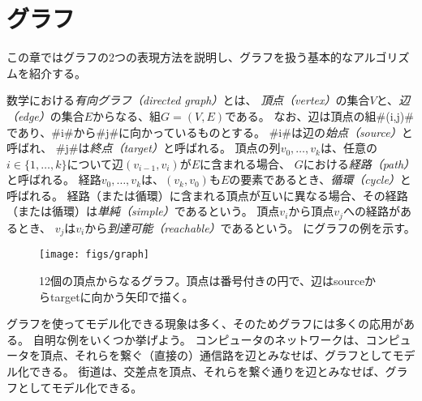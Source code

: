 \chapter{グラフ}


この章ではグラフの2つの表現方法を説明し、グラフを扱う基本的なアルゴリズムを紹介する。

数学における\emph{有向グラフ（directed graph）}とは、
%
%
\emph{頂点（vertex）}の集合$V$と、\emph{辺（edge）}の集合$E$からなる、組$G=(V,E)$である。
%
%
なお、辺は頂点の組#(i,j)#であり、#i#から#j#に向かっているものとする。
%
#i#は辺の\emph{始点（source）}と呼ばれ、
#j#は\emph{終点（target）}と呼ばれる。
頂点の列$v_0,\ldots,v_k$は、任意の$i\in\{1,\ldots,k\}$について辺$(v_{i-1},v_{i})$が$E$に含まれる場合、
$G$における\emph{経路（path）}と呼ばれる。
%
経路$v_0,\ldots,v_k$は、$(v_k,v_0)$も$E$の要素であるとき、\emph{循環（cycle）}と呼ばれる。
%
経路（または循環）に含まれる頂点が互いに異なる場合、その経路（または循環）は\emph{単純（simple）}であるという。
%
頂点$v_i$から頂点$v_j$への経路があるとき、
$v_j$は$v_i$から\emph{到達可能（reachable）}であるという。
にグラフの例を示す。

\begin{figure}
  \begin{center}
    \texttt{[image: figs/graph]}
  \end{center}
  \caption{12個の頂点からなるグラフ。頂点は番号付きの円で、辺はsourceからtargetに向かう矢印で描く。}
\end{figure}

グラフを使ってモデル化できる現象は多く、そのためグラフには多くの応用がある。
自明な例をいくつか挙げよう。
コンピュータのネットワークは、コンピュータを頂点、それらを繋ぐ（直接の）通信路を辺とみなせば、グラフとしてモデル化できる。
街道は、交差点を頂点、それらを繋ぐ通りを辺とみなせば、グラフとしてモデル化できる。

